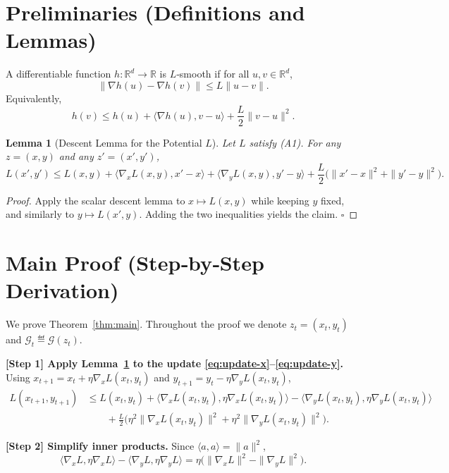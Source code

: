 \documentclass{article}
\newtheorem{lemma}{Lemma}
\begin{document}
\newpage
\section*{Preliminaries (Definitions and Lemmas)}
\begin{definition}[L‑smoothness]
A differentiable function $h:\mathbb{R}^d\to\mathbb{R}$ is $L$‑smooth if for all $u,v\in\mathbb{R}^d$,
\[
\| \nabla h(u)-\nabla h(v) \| \le L\|u-v\|.
\]
Equivalently,
\[
h(v)\le h(u)+\langle\nabla h(u),v-u\rangle+\frac{L}{2}\|v-u\|^2.
\tag{Descent Lemma}
\label{eq:descent-lemma}
\]
\end{definition}

\begin{lemma}[Descent Lemma for the Potential $L$]\label{lem:descent}
Let $L$ satisfy (A1). For any $z=(x,y)$ and any $z'=(x',y')$,
\[
L(x',y')\le L(x,y)+\langle\nabla_x L(x,y),x'-x\rangle+\langle\nabla_y L(x,y),y'-y\rangle
+\frac{L}{2}\big(\|x'-x\|^2+\|y'-y\|^2\big).
\]
\end{lemma}
\begin{proof}
Apply the scalar descent lemma to $x\mapsto L(x,y)$ while keeping $y$ fixed, and similarly to $y\mapsto L(x',y)$. Adding the two inequalities yields the claim. \hfill $\square$
\end{proof}

\section*{Main Proof (Step‑by‑Step Derivation)}
We prove Theorem~\ref{thm:main}. Throughout the proof we denote $z_t=(x_t,y_t)$ and $\mathcal{G}_t\eqdef\mathcal{G}(z_t)$.

\bigskip
\noindent\textbf{[Step 1] Apply Lemma~\ref{lem:descent} to the update \eqref{eq:update-x}–\eqref{eq:update-y}.}  
Using $x_{t+1}=x_t+\eta\nabla_x L(x_t,y_t)$ and $y_{t+1}=y_t-\eta\nabla_y L(x_t,y_t)$,
\begin{align}
L(x_{t+1},y_{t+1})
&\le L(x_t,y_t)
+\langle\nabla_x L(x_t,y_t),\eta\nabla_x L(x_t,y_t)\rangle
-\langle\nabla_y L(x_t,y_t),\eta\nabla_y L(x_t,y_t)\rangle \nonumber\\
&\qquad
+\frac{L}{2}\Big(\eta^2\|\nabla_x L(x_t,y_t)\|^2+\eta^2\|\nabla_y L(x_t,y_t)\|^2\Big). \label{eq:step1}
\end{align}

\noindent\textbf{[Step 2] Simplify inner products.}  
Since $\langle a,a\rangle=\|a\|^2$,
\begin{equation}
\langle\nabla_x L,\eta\nabla_x L\rangle-\langle\nabla_y L,\eta\nabla_y L\rangle
= \eta\big(\|\nabla_x L\|^2-\|\nabla_y L\|^2\big). \label{eq:step2}
\end{equation}
\end{document}
